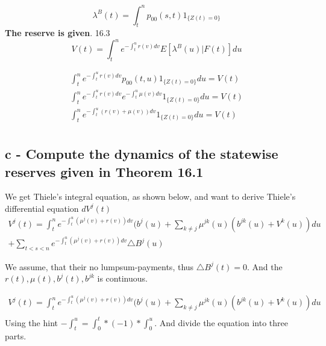 \documentclass[12pt]{article}
\begin{document}
\begin{equation}
\lambda^B(t) = \int_{t}^{n} p_{00}(s,t)1_{\{Z(t)=0\}}
\end{equation}
\textbf{The reserve is given}. 16.3\cite[p.51]{jl}
\begin{equation}
V(t) = \int_{t}^{n} e^{-\int_{t}^{u}r(v)dv} E[\lambda^B(u)|F(t)]du
\end{equation}

\begin{equation}
\begin{split}
\int_{t}^{n}e^{-\int_{t}^{u}r(v)dv} p_{00}(t,u)1_{\{Z(t)=0\}} du = V(t)  \\
\int_{t}^{n}e^{-\int_{t}^{u}r(v)dv} e^{-\int_{t}^{u}\mu(v)dv}1_{\{Z(t)=0\}} du = V(t) \\
\int_{t}^{n}e^{-\int_{t}^{u}(r(v)+\mu(v))dv}1_{\{Z(t)=0\}} du = V(t) \\
\end{split}
\end{equation}

\newpage

\subsection{c - Compute the dynamics of the statewise reserves given in Theorem 16.1}

We get Thiele's integral equation, as shown below, and want to derive Thiele's differential equation $dV^j(t)$
\begin{equation}
\begin{split}
V^j(t) = \int_{t}^{n} e^{-\int_{t}^{u} (\mu^j(v) + r(v))dv} (b^j(u) + \sum_{k\neq j} \mu^{jk}(u) (b^{jk}(u)+V^k(u))du \\
+ \sum_{t < s < n} e^{-\int_{t}^{u} (\mu^j(v) + r(v))dv} \triangle B^{j}(u)
\end{split}
\end{equation}

We assume, that their no lumpsum-payments, thus $\triangle B^{j}(t) = 0$. And the $r(t), \mu(t), b^j(t), b^{jk}$ is continuous.

\begin{equation}
\begin{split}
V^j(t) = \int_{t}^{n} e^{-\int_{t}^{u} (\mu^j(v) + r(v))dv} (b^j(u) + \sum_{k\neq j} \mu^{jk}(u) (b^{jk}(u)+V^k(u))du \\
\end{split}
\end{equation} 
Using the hint $-\int_{t}^{u} = \int_{0}^{t} * (-1)*\int_{0}^{u}$. And divide the equation into three parts.
\end{document}
